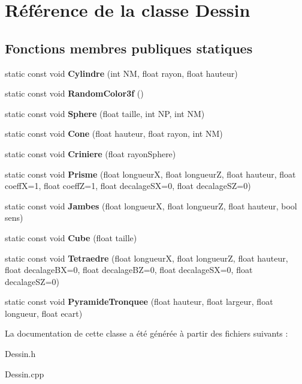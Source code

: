 \hypertarget{class_dessin}{}\section{Référence de la classe Dessin}
\label{class_dessin}
\subsection*{Fonctions membres publiques statiques}
\begin{DoxyCompactItemize}
\item 
\mbox{\label{class_dessin_aa36e6c095ab4bf1fee528728953bee98}} 
static const void {\bfseries Cylindre} (int NM, float rayon, float hauteur)
\item 
\mbox{\label{class_dessin_a182f177b3f3676b47fad13939ccd1f1d}} 
static const void {\bfseries Random\+Color3f} ()
\item 
\mbox{\label{class_dessin_a3e94cc30809a54cf52f8af585821d81e}} 
static const void {\bfseries Sphere} (float taille, int NP, int NM)
\item 
\mbox{\label{class_dessin_ad80eeaf0b55225c2b14cd0f9a264467d}} 
static const void {\bfseries Cone} (float hauteur, float rayon, int NM)
\item 
\mbox{\label{class_dessin_a9c3bb8f5e291f4aca07faf54a675bfd5}} 
static const void {\bfseries Criniere} (float rayon\+Sphere)
\item 
\mbox{\label{class_dessin_a5ed82bd5358f7a599f9520a5054f289a}} 
static const void {\bfseries Prisme} (float longueurX, float longueurZ, float hauteur, float coeffX=1, float coeffZ=1, float decalage\+SX=0, float decalage\+SZ=0)
\item 
\mbox{\label{class_dessin_af27167955e343e1212caf2f316c0f24c}} 
static const void {\bfseries Jambes} (float longueurX, float longueurZ, float hauteur, bool sens)
\item 
\mbox{\label{class_dessin_a332bce5d8a1cb064390dda15967d99ab}} 
static const void {\bfseries Cube} (float taille)
\item 
\mbox{\label{class_dessin_ad98b691c69141bfdab33c03fdf9e50ff}} 
static const void {\bfseries Tetraedre} (float longueurX, float longueurZ, float hauteur, float decalage\+BX=0, float decalage\+BZ=0, float decalage\+SX=0, float decalage\+SZ=0)
\item 
\mbox{\label{class_dessin_ad69b7fb51691201474e6206cec517978}} 
static const void {\bfseries Pyramide\+Tronquee} (float hauteur, float largeur, float longueur, float ecart)
\end{DoxyCompactItemize}


La documentation de cette classe a été générée à partir des fichiers suivants \+:\begin{DoxyCompactItemize}
\item 
Dessin.\+h\item 
Dessin.\+cpp\end{DoxyCompactItemize}
